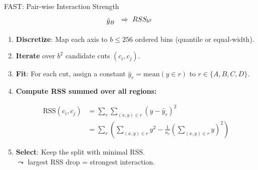 \documentclass[10pt,compress,t,notes=noshow, xcolor=table]{beamer}
\begin{document}
\begin{framev}[fs=small,align=top]{FAST: Pair-wise Interaction Strength}
{{$$\begin{array}{@{}l@{\hskip 0.6em}l@{\hskip 0.6em}l@{\hskip 0.6em}l@{\hskip 0.6em}l}
\begin{tikzpicture}[baseline=(current bounding box.center)]
\node at (1,0.8) {$\hat{y}_B$};
\end{tikzpicture} & \text{$\Rightarrow$} & \text{$RSS_{b^2}$}\\
\end{array}
$$
}
}{
\spacer[0]
\begin{enumerate}
\item<1-> {\bf Discretize}: Map each axis to $b\!\le\!256$ ordered bins (quantile or equal-width).
\item<2-> {\bf Iterate} over $b^{2}$ candidate cuts $(c_i,c_j)$. %
\item<2-> {\bf Fit}: For each cut, assign a constant $\hat y_r\!=\!\text{mean}(y\!\in\!r)$ to $r\!\in\!\{A,B,C,D\}$.
\item<2-> {\bf Compute RSS summed over all regions:}
\begin{footnotesize}
$$
\begin{aligned}
\text{RSS}(c_i, c_j)
&= \sum_{r} \sum_{(x,y) \in r} (y - \hat{y}_r)^2 \\
&= \sum_{r} \left( \sum_{(x,y) \in r} y^2 - \frac{1}{n_r} \left(\sum_{(x,y) \in r} y \right)^2 \right)
\end{aligned}
$$
 
             
\end{footnotesize}
\item<2-> {\bf Select}: Keep the split with minimal RSS.\\
$\leadsto$ largest RSS drop = strongest interaction. \\%
\end{enumerate}
}
\end{framev}
\end{document}
